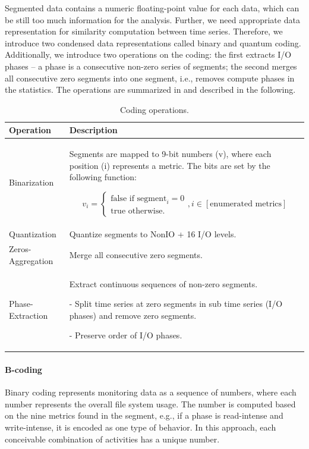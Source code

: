 \documentclass{jhps}
\begin{document}
Segmented data contains a numeric floating-point value for each data, which can be still too much information for the analysis.
Further, we need appropriate data representation for similarity computation between time series.
Therefore, we introduce two condensed data representations called binary and quantum coding.
Additionally, we introduce two operations on the coding:
the first extracts I/O phases -- a phase is a consecutive non-zero series of segments;
the second merges all consecutive zero segments into one segment, i.e., removes compute phases in the statistics.
The operations are summarized in  and described in the following.

\begin{table}[t]
 \centering
 \begin{tabularx}{\textwidth}{lX}
	 Operation &  Description \\
	 \midrule
	 Binarization & Segments are mapped to 9-bit numbers (v), where each position (i) represents a metric.
The bits are set by the following function:

	 \vbox{
		\begin{equation}
			v_i =
			\begin{cases}
				\text{false if segment}_i = 0\\\text{true otherwise.}
			\end{cases}, i \in [\text{enumerated metrics}]
		\end{equation}
	 } \\[-1em]
	 Quantization & Quantize segments to NonIO + 16 I/O levels.\\
	 Zeros-Aggregation & Merge all consecutive zero segments.\\
	 Phase-Extraction &  Extract continuous sequences of non-zero segments.
\par - Split time series at zero segments in sub time series (I/O phases) and remove zero segments.
\par - Preserve order of I/O phases.\\
 \end{tabularx}
 \caption{Coding operations.}
 \label{tab:coding_ops}
\end{table}

\paragraph{B-coding}
Binary coding represents monitoring data as a sequence of numbers, where each number represents the overall file system usage.
The number is computed based on the nine metrics found in the segment, e.g., if a phase is read-intense and write-intense, it is encoded as one type of behavior.
In this approach, each conceivable combination of activities has a unique number.
\end{document}
